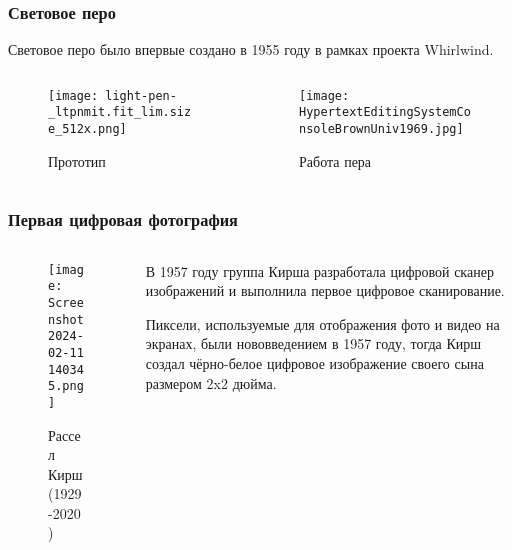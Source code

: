 \documentclass[10pt]{beamer}
\begin{document}
\begin{frame}\frametitle{Световое перо}{
	Световое перо было впервые создано в 1955 году в рамках проекта Whirlwind. 
    \begin{columns}[T]
    	\begin{column}{0.5\textwidth}
    		\begin{figure}
    			\centering
    			\texttt{[image: light-pen-\_ltpnmit.fit\_lim.size\_512x.png]}
    			\caption{Прототип}
    		\end{figure}	
			
    	\end{column}
    	\begin{column}{0.5\textwidth}
    		\begin{figure}
    			\centering
    			\texttt{[image: HypertextEditingSystemConsoleBrownUniv1969.jpg]}
    			\caption{Работа пера}
    		\end{figure}
    	\end{column}
    \end{columns}
}\end{frame}

\begin{frame}\frametitle{Первая цифровая фотография}
{
	\begin{columns}
		\begin{column}{0.4\textwidth}
			\begin{figure}
				\centering
				\texttt{[image: Screenshot 2024-02-11 140345.png]}
				\caption{\centering Рассел Кирш (1929-2020) }
			\end{figure}
		\end{column}
		\begin{column}{0.6\textwidth}
			В 1957 году группа Кирша разработала цифровой сканер изображений и выполнила первое цифровое сканирование.
			
			Пиксели, используемые для отображения фото и видео на экранах, были нововведением в 1957 году, тогда Кирш создал чёрно-белое цифровое изображение своего сына размером 2x2 дюйма.
		\end{column}
	\end{columns}
}\end{frame}
\end{document}
